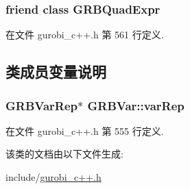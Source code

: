 \subsubsection[{\texorpdfstring{G\+R\+B\+Quad\+Expr}{GRBQuadExpr}}]{\setlength{\rightskip}{0pt plus 5cm}friend class {\bf G\+R\+B\+Quad\+Expr}\hspace{0.3cm}{\ttfamily [friend]}}\hypertarget{classGRBVar_a009c524a57973d6bb8fe064cf7546546}{}\label{classGRBVar_a009c524a57973d6bb8fe064cf7546546}


在文件 gurobi\+\_\+c++.\+h 第 561 行定义.



\subsection{类成员变量说明}
\subsubsection[{\texorpdfstring{var\+Rep}{varRep}}]{\setlength{\rightskip}{0pt plus 5cm}G\+R\+B\+Var\+Rep$\ast$ G\+R\+B\+Var\+::var\+Rep\hspace{0.3cm}{\ttfamily [private]}}\hypertarget{classGRBVar_a365c4e6fdc26fb055c9db636eff617e3}{}\label{classGRBVar_a365c4e6fdc26fb055c9db636eff617e3}


在文件 gurobi\+\_\+c++.\+h 第 555 行定义.



该类的文档由以下文件生成\+:\begin{DoxyCompactItemize}
\item 
include/\hyperlink{gurobi__c_09_09_8h}{gurobi\+\_\+c++.\+h}\end{DoxyCompactItemize}
